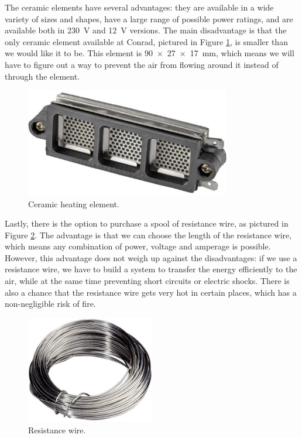 \documentclass[a4paper,oneside]{book}
\begin{document}
The ceramic elements have several advantages: they are available in a wide
variety of sizes and shapes, have a large range of possible power ratings, and
are available both in \SI{230}{\V} and \SI{12}{\V} versions. The main
disadvantage is that the only ceramic element available at Conrad, pictured in
Figure \ref{fig:ceramic-heating}, is smaller than we would like it to be. This
element is \SI{90x27x17}{\mm}, which means we will have to figure out a way to
prevent the air from flowing around it instead of through the element.

\begin{figure}[h]
\centering
\includegraphics[width=0.8\textwidth]{images/ceramic-heater.jpg}
\caption{Ceramic heating element. \protect\cite{ceramic-heater}}
\label{fig:ceramic-heating}
\end{figure}

Lastly, there is the option to purchase a spool of resistance wire, as pictured
in Figure \ref{fig:wire-heating}. The advantage is that we can choose the
length of the resistance wire, which means any combination of power, voltage
and amperage is possible. However, this advantage does not weigh up against the
disadvantages: if we use a resistance wire, we have to build a system to
transfer the energy efficiently to the air, while at the same time preventing
short circuits or electric shocks. There is also a chance that the resistance
wire gets very hot in certain places, which has a non-negligible risk of fire.

\begin{figure}[h]
\centering
\includegraphics[width=0.5\textwidth]{images/wire-heater.jpg}
\caption{Resistance wire. \protect\cite{wire-heater}}
\label{fig:wire-heating}
\end{figure}
\end{document}
